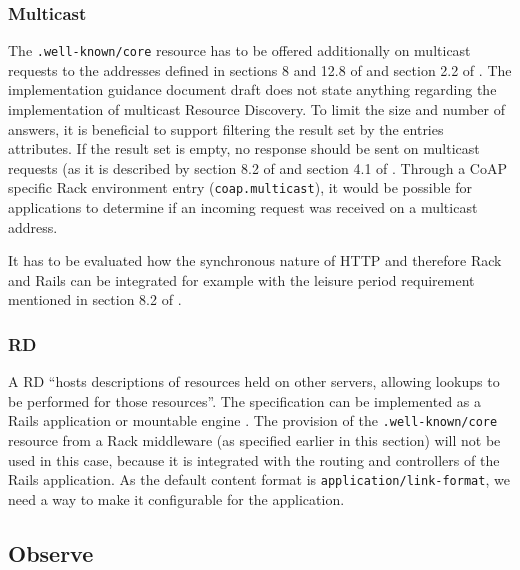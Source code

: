 		\subsubsection{Multicast}
		\label{cha:design:protocol:multicast}

			The \texttt{.well-known/core} resource has to be offered
			additionally on multicast requests to the addresses defined in
			sections 8 and 12.8 of \cite{coap} and section 2.2 of
			\cite{coap-group}. The implementation guidance document draft
			\cite{coap-guide} does not state anything regarding the
			implementation of multicast Resource Discovery. To limit the size
			and number of answers, it is beneficial to support filtering the
			result set by the entries attributes. If the result set is empty,
			no response should be sent on multicast requests (as it is
			described by section 8.2 of \cite{coap} and section 4.1 of
			\cite{link}. Through a \ac{CoAP} specific Rack environment entry
			(\texttt{coap.multicast}), it would be possible for applications to
			determine if an incoming request was received on a multicast
			address.


			It has to be evaluated how the synchronous nature of \ac{HTTP} and
			therefore Rack and \ac{Rails} can be integrated for example with
			the leisure period requirement mentioned in section 8.2 of
			\cite{coap}.

		\subsubsection{\acf{RD}}
		\label{cha:design:protocol:rd}

			A \acl{RD} \cite{rd} \enquote{hosts descriptions of resources held
			on other servers, allowing lookups to be performed for those
			resources}. The specification can be implemented as a \ac{Rails}
			application or mountable engine \cite{rails-engine}. The provision
			of the \texttt{.well-known/core} resource from a Rack middleware
			(as specified earlier in this section) will not be used in this
			case, because it is integrated with the routing and controllers of
			the \ac{Rails} application. As the default content format is
			\texttt{application/link-format}, we need a way to make it
			configurable for the application.

	\subsection{Observe}
	\label{cha:design:protocol:observe}

